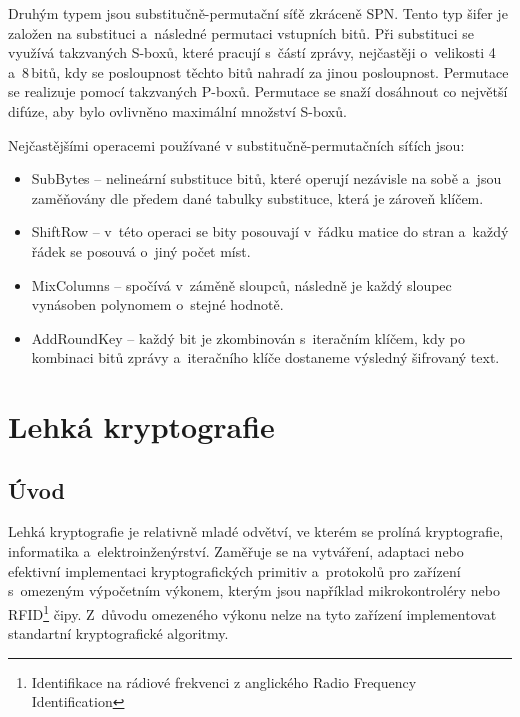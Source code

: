 Druhým typem jsou substitučně-permutační síťě zkráceně SPN. Tento typ šifer je založen na substituci a~následné permutaci vstupních bitů. Při substituci se využívá takzvaných S-boxů, které pracují s~částí zprávy, nejčastěji o~velikosti 4 a~8\,bitů, kdy se posloupnost těchto bitů nahradí za jinou posloupnost. Permutace se realizuje pomocí takzvaných P-boxů. Permutace se snaží dosáhnout co největší difúze, aby bylo ovlivněno maximální množství S-boxů.\cite{SaldaBP}%

Nejčastějšími operacemi používané v substitučně-permutačních síťích jsou:
\begin{itemize}
    \item SubBytes -- nelineární substituce bitů, které operují nezávisle na sobě a~jsou zaměňovány dle předem dané tabulky substituce, která je zároveň klíčem. 
    \item ShiftRow -- v~této operaci se bity posouvají v~řádku matice do stran a~každý řádek se posouvá o~jiný počet míst.
    \item MixColumns -- spočívá v~záměně sloupců, následně je každý sloupec vynásoben polynomem o~stejné hodnotě.
    \item AddRoundKey -- každý bit je zkombinován s~iteračním klíčem, kdy po kombinaci bitů zprávy a~iteračního klíče dostaneme výsledný šifrovaný text.\cite{HavlicekBakalarka}
\end{itemize}
\null
\vfill

\chapter{Lehká kryptografie}
\section{Úvod}
Lehká kryptografie je relativně mladé odvětví, ve kterém se prolíná kryptografie, informatika  a~elektroinženýrství. Zaměřuje se na vytváření, adaptaci nebo efektivní implementaci kryptografických primitiv a~protokolů pro zařízení s~omezeným výpočetním výkonem, kterým jsou například mikrokontroléry nebo RFID\footnote{Identifikace na rádiové frekvenci z anglického Radio Frequency Identification} čipy. Z~důvodu omezeného výkonu nelze na tyto zařízení implementovat standartní kryptografické algoritmy.\cite{PoschmannCrypto}


